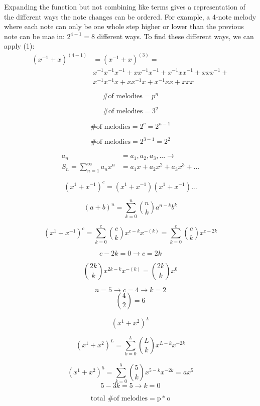 \documentclass{article}
\begin{document}
Expanding the function but not combining like terms gives a representation of the different ways the note changes can be ordered. For example, a 4-note melody where each note can only be one whole step higher or lower than the previous note can be mae in: \(2^{4-1} = 8\)
different ways. To find these different ways, we can apply (1):
\begin{align*}
    (x^{-1} + x)^(4-1) & = (x^{-1} + x)^(3) = \\
    & x^{-1} x^{-1} x^{-1} + x x^{-1} x^{-1} + x^{-1} x x^{-1} + x x x^{-1} + \\
    & x^{-1} x^{-1} x + x x^{-1} x + x^{-1} x x + x x x
\end{align*}

\newpage
\[\mbox{\# of melodies} = p^n\]

\[\mbox{\# of melodies} = 3^2\]

\[\mbox{\# of melodies} = 2^c = 2^{n-1}\]

\[\mbox{\# of melodies} = 2^{3-1} = 2^{2}\]

\begin{center}
\begin{align}
    a_n & = a_1, a_2, a_3, ... \rightarrow \\ 
    S_n = \sum_{n=1}^{\infty} a_n x^n & = a_1x + a_2x^2 + a_3x^3 + ...
\end{align}
\end{center}

\[(x^1 + x^{-1})^c = (x^1 + x^{-1})(x^1 + x^{-1})...\]

\[(a+b)^n = \sum_{k=0}^n {n \choose k} a^{n-k}b^k\]

\[(x^1 + x^{-1})^c = \sum_{k=0}^c {c \choose k}x^{c-k}x^{-(k)} = \sum_{k=0}^c {c \choose k}x^{c-2k}\]

\[c-2k = 0 \rightarrow c=2k\] 

\[{2k \choose k}x^{2k-k}x^{-(k)} = {2k \choose k}x^0\]

\[n=5 \rightarrow c = 4 \rightarrow k=2\]
\[{4 \choose 2} = 6\]

\[(x^1 + x^2)^L\]

\[(x^1 + x^2)^L = \sum_{k=0}^L {L \choose k} x^{L-k}x^{-2k}\]

\[(x^1 + x^2)^5 = \sum_{k=0}^5 {5 \choose k} x^{5-k}x^{-2k} = ax^5\]
\[5-3k = 5 \rightarrow k=0\]

\[\mbox{total \# of melodies} = \mbox{p} * \mbox{o}\]
\end{document}
